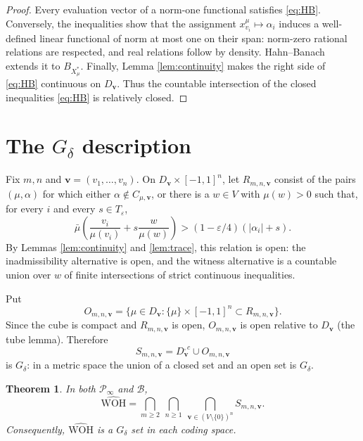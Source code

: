 \documentclass[11pt]{article}
\newtheorem{theorem}{Theorem}
\newcommand{\abs}[1]{\lvert#1\rvert}
\newcommand{\Bcal}{\mathcal B}
\newcommand{\Pinf}{\mathcal P_\infty}
\newcommand{\WOH}{\widehat{\mathrm{WOH}}}
\begin{document}
\begin{proof}
Every evaluation vector of a norm-one functional satisfies
\eqref{eq:HB}.  Conversely, the inequalities show that the assignment
$x_{v_i}^\mu\mapsto\alpha_i$ induces a well-defined linear functional of
norm at most one on their span: norm-zero rational relations are respected,
and real relations follow by density.  Hahn--Banach extends it to
$B_{X_\mu^*}$.  Finally, Lemma \ref{lem:continuity} makes the right side of
\eqref{eq:HB} continuous on $D_{\mathbf v}$.  Thus the countable
intersection of the closed inequalities \eqref{eq:HB} is relatively closed.
\end{proof}

\section{\texorpdfstring{The $G_\delta$ description}{The G-delta description}}

Fix $m,n$ and $\mathbf v=(v_1,\ldots,v_n)$.  On
$D_{\mathbf v}\times[-1,1]^n$, let $R_{m,n,\mathbf v}$ consist of the pairs
$(\mu,\alpha)$ for which either $\alpha\notin C_{\mu,\mathbf v}$, or there
is a $w\in V$ with $\mu(w)>0$ such that, for every $i$ and every
$s\in T_\varepsilon$,
\begin{equation}\label{eq:openwitness}
 \bar\mu\!\left(
       \frac{v_i}{\mu(v_i)}+s\frac{w}{\mu(w)}\right)
 >(1-\varepsilon/4)(\abs{\alpha_i}+s).
\end{equation}
By Lemmas \ref{lem:continuity} and \ref{lem:trace}, this relation is open:
the inadmissibility alternative is open, and the witness alternative is a
countable union over $w$ of finite intersections of strict continuous
inequalities.

Put
\[
 O_{m,n,\mathbf v}
 =\{\mu\in D_{\mathbf v}:
       \{\mu\}\times[-1,1]^n\subset R_{m,n,\mathbf v}\}.
\]
Since the cube is compact and $R_{m,n,\mathbf v}$ is open,
$O_{m,n,\mathbf v}$ is open relative to $D_{\mathbf v}$ (the tube lemma).
Therefore
\[
 S_{m,n,\mathbf v}=D_{\mathbf v}^{,c}\cup O_{m,n,\mathbf v}
\]
is $G_\delta$: in a metric space the union of a closed set and an open set
is $G_\delta$.

\begin{theorem}\label{thm:main}
In both $\Pinf$ and $\Bcal$,
\begin{equation}\label{eq:gdelta}
 \WOH=
 \bigcap_{m\geq2}\ \bigcap_{n\geq1}\
 \bigcap_{\mathbf v\in(V\setminus\{0\})^n}
 S_{m,n,\mathbf v}.
\end{equation}
Consequently, $\WOH$ is a $G_\delta$ set in each coding space.
\end{theorem}
\end{document}
